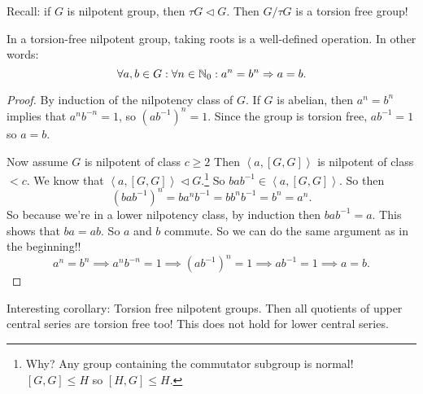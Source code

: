 Recall: if $G$ is nilpotent group, then  $\tau G \triangleleft  G$. Then $G / \tau G$ is a torsion free group!

\begin{theorem}
    In a torsion-free nilpotent group, taking roots is a well-defined operation.
    In other words:
    \[
    \forall a, b \in G: \forall n \in \mathbb{N}_0: a^{n} = b^{n} \Rightarrow a = b
    .\] 
\end{theorem}
\begin{proof}
    By induction of the nilpotency class of $G$.
    If $G$ is abelian, then $a^{n} = b^{n}$ implies that $a^{n} b^{-n}=1$, so $(a b^{-1})^{n} = 1$. Since the group is torsion free, $ab^{-1} = 1$ so $a = b$.

    Now assume $G$ is nilpotent of class  $c\ge 2$
    Then $\left<a, [G, G] \right>$ is nilpotent of class $<c$.
    We know that $\left<a, [G, G] \right> \triangleleft G$.\footnote{Why? Any group containing the commutator subgroup is normal! $[G, G] \le H$ so $[H, G] \le H$.} So $b a b^{-1} \in \left<a, [G, G] \right>$.
    So then
    \[
        (b a b^{-1})^{n} = b a^{n} b^{-1} = b b^{n} b^{-1} = b^{n} = a^{n}
    .\] 
    So because we're in a lower nilpotency class, by induction then $b a b^{-1} = a$.
    This shows that $ba = ab$.
    So $a$ and  $b$ commute. So we can do the same argument as in the beginning!!
    \[
        a^{n} = b^{n} \implies a^{n} b^{-n} = 1 \implies (a b^{-1})^{n} = 1 \implies ab^{-1} = 1 \implies a = b
    .\] 
\end{proof}

Interesting corollary: Torsion free nilpotent groups. Then all quotients of upper central series are torsion free too! This does not hold for lower central series.

